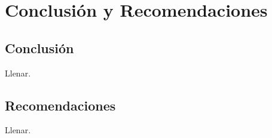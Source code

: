 \chapter{Conclusión y Recomendaciones}

\section{Conclusión}

Llenar.

\section{Recomendaciones}

Llenar.
